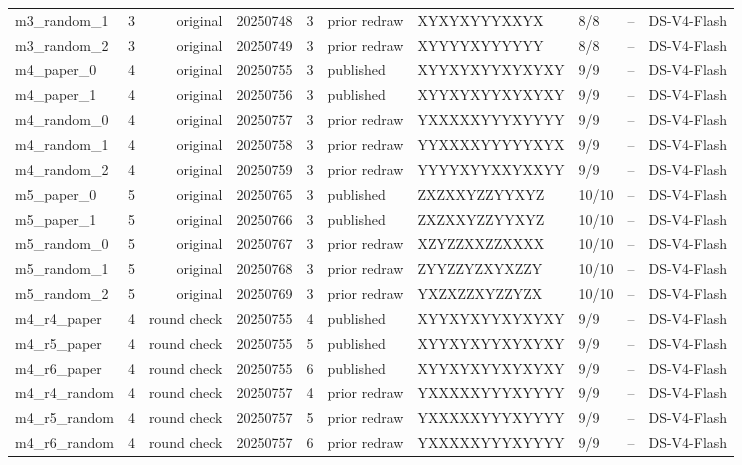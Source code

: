 \begin{longtable}{p{2.6cm}rrrp{.8cm}p{1.6cm}p{3.0cm}p{1.0cm}p{1.0cm}p{2.0cm}}
m3\_random\_1 & 3 & original & 20250748 & 3 & prior redraw & XYXYXYYYXXYX & 8/8 & -- & DS-V4-Flash \\
m3\_random\_2 & 3 & original & 20250749 & 3 & prior redraw & XYYYYXYYYYYY & 8/8 & -- & DS-V4-Flash \\
m4\_paper\_0 & 4 & original & 20250755 & 3 & published & XYYXYXYYXYXYXY & 9/9 & -- & DS-V4-Flash \\
m4\_paper\_1 & 4 & original & 20250756 & 3 & published & XYYXYXYYXYXYXY & 9/9 & -- & DS-V4-Flash \\
m4\_random\_0 & 4 & original & 20250757 & 3 & prior redraw & YXXXXXYYYXYYYY & 9/9 & -- & DS-V4-Flash \\
m4\_random\_1 & 4 & original & 20250758 & 3 & prior redraw & YYXXXXYYYYYXYX & 9/9 & -- & DS-V4-Flash \\
m4\_random\_2 & 4 & original & 20250759 & 3 & prior redraw & YYYYXYYXXYXXYY & 9/9 & -- & DS-V4-Flash \\
m5\_paper\_0 & 5 & original & 20250765 & 3 & published & ZXZXXYZZYYXYZ & 10/10 & -- & DS-V4-Flash \\
m5\_paper\_1 & 5 & original & 20250766 & 3 & published & ZXZXXYZZYYXYZ & 10/10 & -- & DS-V4-Flash \\
m5\_random\_0 & 5 & original & 20250767 & 3 & prior redraw & XZYZZXXZZXXXX & 10/10 & -- & DS-V4-Flash \\
m5\_random\_1 & 5 & original & 20250768 & 3 & prior redraw & ZYYZZYZXYXZZY & 10/10 & -- & DS-V4-Flash \\
m5\_random\_2 & 5 & original & 20250769 & 3 & prior redraw & YXZXZZXYZZYZX & 10/10 & -- & DS-V4-Flash \\
m4\_r4\_paper & 4 & round check & 20250755 & 4 & published & XYYXYXYYXYXYXY & 9/9 & -- & DS-V4-Flash \\
m4\_r5\_paper & 4 & round check & 20250755 & 5 & published & XYYXYXYYXYXYXY & 9/9 & -- & DS-V4-Flash \\
m4\_r6\_paper & 4 & round check & 20250755 & 6 & published & XYYXYXYYXYXYXY & 9/9 & -- & DS-V4-Flash \\
m4\_r4\_random & 4 & round check & 20250757 & 4 & prior redraw & YXXXXXYYYXYYYY & 9/9 & -- & DS-V4-Flash \\
m4\_r5\_random & 4 & round check & 20250757 & 5 & prior redraw & YXXXXXYYYXYYYY & 9/9 & -- & DS-V4-Flash \\
m4\_r6\_random & 4 & round check & 20250757 & 6 & prior redraw & YXXXXXYYYXYYYY & 9/9 & -- & DS-V4-Flash \\
\end{longtable}
